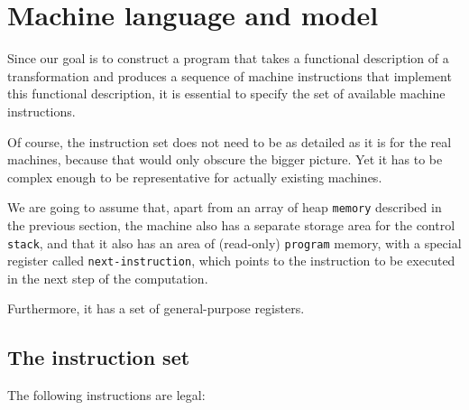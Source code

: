 


\section{Machine language and model}

Since our goal is to construct a program that takes a functional
description of a transformation and produces a sequence of machine
instructions that implement this functional description, it is
essential to specify the set of available machine instructions.

Of course, the instruction set does not need to be as detailed
as it is for the real machines, because that would only obscure
the bigger picture. Yet it has to be complex enough to be representative
for actually existing machines.

We are going to assume that, apart from an array of heap \texttt{memory}
described in the previous section, the machine also has a separate
storage area for the control \texttt{stack}, and that it also has an area of
(read-only) \texttt{program} memory, with a special register called
\texttt{next-instruction}, which points to the instruction to be
executed in the next step of the computation.

Furthermore, it has a set of general-purpose registers.

\subsection{The instruction set}

The following instructions are legal: 

